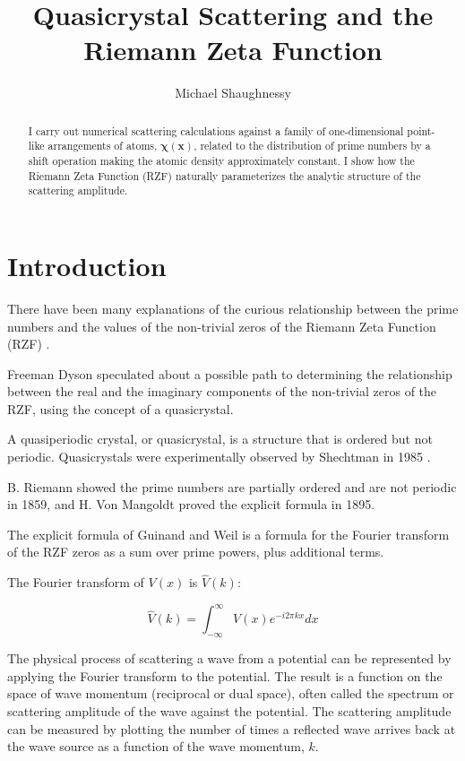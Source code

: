 \documentclass[11pt, oneside]{article}
\title{Quasicrystal Scattering and the Riemann Zeta Function}
\author{Michael Shaughnessy}
\begin{document}
\maketitle

\begin{abstract}
I carry out numerical scattering calculations against a family of one-dimensional point-like arrangements of atoms, $\mathbf{\chi(x)}$, related to the distribution of prime numbers by a shift operation making the atomic density approximately constant. 
I show how the Riemann Zeta Function (RZF) naturally parameterizes the analytic structure of the scattering amplitude.
\end{abstract}

\section{Introduction}

There have been many explanations of the curious relationship between the prime numbers and the values of the non-trivial zeros of the Riemann Zeta Function (RZF) \cite{Riemann1859, Selberg1956, Dyson2009, Zhang2014}.

Freeman Dyson \cite{Baez2013} speculated about a possible path to determining the relationship between the real and the imaginary components of the non-trivial zeros of the RZF, using the concept of a quasicrystal.

A quasiperiodic crystal, or quasicrystal, is a structure that is ordered but not periodic. Quasicrystals were experimentally observed by Shechtman in 1985 \cite{PhysRevLett.53.1951}. 

B. Riemann showed the prime numbers are partially ordered and are not periodic \cite{Riemann1859} in 1859, and H. Von Mangoldt \cite{VonMangoldt1895} proved the explicit formula in 1895.

The explicit formula of Guinand and Weil \cite{Weil} is a formula for the Fourier transform of the RZF zeros as a sum over prime powers, plus additional terms.  

The Fourier transform of $V(x)$ is $\hat{V}(k)$:

\begin{equation}
\hat{V}(k) = \int_{-\infty}^{\infty}V(x)e^{-i2\pi kx}dx
\end{equation}

The physical process of scattering a wave from a potential can be represented by applying the Fourier transform to the potential. The result is a function on the space of wave momentum (reciprocal or dual space), often called the spectrum or scattering amplitude of the wave against the potential. The scattering amplitude can be measured by plotting the number of times a reflected wave arrives back at the wave source as a function of the wave momentum, $k$.
\end{document}
